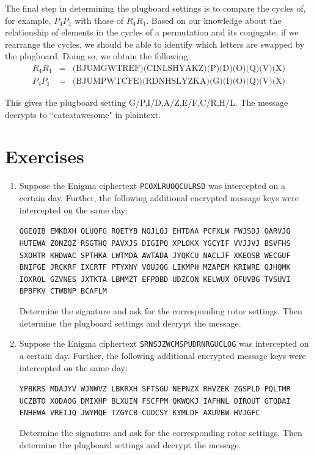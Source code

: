 \documentclass{book}
\theoremstyle{plain}
\theoremstyle{definition}
\newif\ifprintsolutions
\newcommand{\solution}[1]{\ifprintsolutions \begin{sloppypar}{\it #1}\end{sloppypar} \fi} %
\newcommand{\ciphertext}[1]{\texttt{#1}} %
\newcommand{\display}[1]{\begin{sloppypar}\setlength{\parindent}{0mm}#1\end{sloppypar}} %
\begin{document}
The final step in determining the plugboard settings is to compare the cycles of, for example, $P_4P_1$ with those of $R_4R_1$. Based on our knowledge about the relationship of elements in the cycles of a permutation and its conjugate, if we rearrange the cycles, we should be able to identify which letters are swapped by the plugboard. Doing so, we obtain the following:
\begin{eqnarray*}
R_4R_1 &=& \text{(BJUMGWTREF)(CINLSHYAKZ)(P)(D)(O)(Q)(V)(X)} \\
P_4P_1 &=& \text{(BJUMPWTCFE)(RDNHSLYZKA)(G)(I)(O)(Q)(V)(X)}
\end{eqnarray*}

This gives the plugboard setting G/P,I/D,A/Z,E/F,C/R,H/L. The message decrypts to ``catcatawesome" in plaintext.

\section{Exercises}
\begin{enumerate}
\item Suppose the Enigma ciphertext \ciphertext{PCOXLRUOQCULRSD} was intercepted on a certain day. Further, the following additional encrypted message keys were intercepted on the same day:
\display{\ciphertext{QGEQIB EMKDXH QLUQFG RQETYB NOJLQJ EHTDAA PCFXLW FWJSDJ OARVJO HUTEWA ZONZQZ RSGTHQ PAVXJS DIGIPQ XPLOKX YGCYIF VVJJVJ BSVFHS SXOHTR KHDWAC SPTHKA LWTMDA AWTADA JYQKCU NACLJF XKEOSB WECGUF BNIFGE JRCKRF IXCRTF PTYXNY VOUJQG LIKMPH MZAPEM KRIWRE QJHQMK IOXRQL GZVNES JXTKTA LBMMZT EFPDBD UDZCON KELWUX OFUVBG TVSUVI BPBFKV CTWBNP BCAFLM}}
Determine the signature and ask for the corresponding rotor settings. Then determine the plugboard settings and decrypt the message. \solution{Signature $(11-11-1-1-1-1,12-12-1-1,5-5-3-3-2-2-2-2-1-1)$, rotor order 312, rotor position VHW, plugboard F-V/H-R/I-N/T-A/U-Q/O-Z: SKL SKL free candy}
\item Suppose the Enigma ciphertext \ciphertext{SRNSJZWCMSPUDRNRGUCLOG} was intercepted on a certain day. Further, the following additional encrypted message keys were intercepted on the same day:
\display{\ciphertext{YPBKRS MDAJYV WJNWVZ LBKRXH SFTSGU NEPNZX RHVZEK ZGSPLD PQLTMR UCZBTO XODAOG DMIXHP BLXUIN FSCFPM QKWQKJ IAFHNL OIROUT GTQDAI ENHEWA VREIJQ JWYMQE TZGYCB CUOCSY KYMLDF AXUVBW HVJGFC}}
Determine the signature and ask for the corresponding rotor settings. Then determine the plugboard settings and decrypt the message. \solution{Cycle structures $(7-7-2-2-1-1-1-1-1-1-1-1,10-10-2-2-1-1,9-9-4-4)$, rotor settings 213 RVD, plugboard 1: ETC ETC friday is sherlock}
\end{enumerate}
\end{document}
